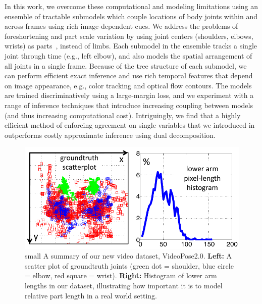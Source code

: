 In this work, we overcome these computational and modeling limitations
using an ensemble of tractable submodels which couple
locations of body joints within and across frames using rich
image-dependent cues.  We address the problems of foreshortening and
part scale variation by using joint centers (shoulders, elbows,
wrists) as parts~\cite{lee06,urtasun08,rogez08}, instead of
limbs. Each submodel in the ensemble tracks a
single joint through time (e.g., left elbow), and also models the
spatial arrangement of all joints in a single frame.  Because of the
tree structure of each submodel, we can perform efficient exact
inference and use rich temporal features that depend on image
appearance, e.g., color tracking and optical flow contours. The models
are trained discriminatively using a large-margin loss, and we
experiment with a range of inference techniques that introduce
increasing coupling between models (and thus increasing computational
cost). Intriguingly, we find that a highly efficient method of
enforcing agreement on single variables that we introduced in
\cite{weisssapp10} outperforms costly approximate inference using dual
decomposition.

\begin{figure}[tb!]
\centering
\includegraphics[width=0.9\linewidth]{figs/videopose-dataset-stats.pdf}
\caption[VideoPose2.0 statistics]{small \label{fig:dataset} A summary of our 
new video dataset, VideoPose2.0.  \textbf{Left:} A scatter plot of groundtruth 
joints (green dot = shoulder, blue circle = elbow, red square = wrist).  
\textbf{Right:} Histogram of lower arm lengths in our dataset, illustrating how 
important it is to model relative part length in a real world setting.  }
\label{fig:videopose-dataset-stats}
\end{figure}




